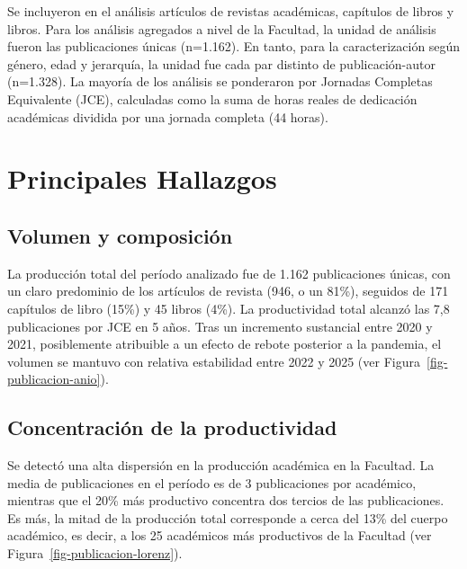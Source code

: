 \documentclass[
  spanish,
  a4paper,
  oneside]{scrbook}
\begin{document}
Se incluyeron en el análisis artículos de revistas académicas, capítulos
de libros y libros. Para los análisis agregados a nivel de la Facultad,
la unidad de análisis fueron las publicaciones únicas (n=1.162). En
tanto, para la caracterización según género, edad y jerarquía, la unidad
fue cada par distinto de publicación-autor (n=1.328). La mayoría de los
análisis se ponderaron por Jornadas Completas Equivalente (JCE),
calculadas como la suma de horas reales de dedicación académicas
dividida por una jornada completa (44 horas).

\section*{Principales Hallazgos}\label{principales-hallazgos}


\subsection*{Volumen y composición}\label{volumen-y-composiciuxf3n}

La producción total del período analizado fue de 1.162 publicaciones
únicas, con un claro predominio de los artículos de revista (946, o un
81\%), seguidos de 171 capítulos de libro (15\%) y 45 libros (4\%). La
productividad total alcanzó las 7,8 publicaciones por JCE en 5 años.
Tras un incremento sustancial entre 2020 y 2021, posiblemente atribuible
a un efecto de rebote posterior a la pandemia, el volumen se mantuvo con
relativa estabilidad entre 2022 y 2025 (ver
Figura~\ref{fig-publicacion-anio}).

\subsection*{Concentración de la
productividad}\label{concentraciuxf3n-de-la-productividad}

Se detectó una alta dispersión en la producción académica en la
Facultad. La media de publicaciones en el período es de 3 publicaciones
por académico, mientras que el 20\% más productivo concentra dos tercios
de las publicaciones. Es más, la mitad de la producción total
corresponde a cerca del 13\% del cuerpo académico, es decir, a los 25
académicos más productivos de la Facultad (ver
Figura~\ref{fig-publicacion-lorenz}).
\end{document}
